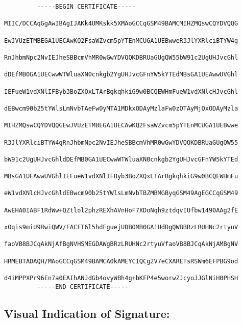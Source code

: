 \begin{verbatim}
         -----BEGIN CERTIFICATE-----
         MIIC/DCCAqGgAwIBAgIJAKk4UMKskk5XMAoGCCqGSM49BAMCMIHZMQswCQYDVQQG
         EwJVUzETMBEGA1UECAwKQ2FsaWZvcm5pYTEnMCUGA1UEBwweR3JlYXRlciBTYW4g
         RnJhbmNpc2NvIEJheSBBcmVhMR0wGwYDVQQKDBRUaGUgQW55bW91c2UgUHJvcGhl
         dDEfMB0GA1UECwwWTWluaXN0cnkgb2YgUHJvcGFnYW5kYTEdMBsGA1UEAwwUVGhl
         IEFueW1vdXNlIFByb3BoZXQxLTArBgkqhkiG9w0BCQEWHmFueW1vdXNlcHJvcGhl
         dEBwcm90b25tYWlsLmNvbTAeFw0yMTA1MDkxODAyMzlaFw0zOTAyMjQxODAyMzla
         MIHZMQswCQYDVQQGEwJVUzETMBEGA1UECAwKQ2FsaWZvcm5pYTEnMCUGA1UEBwwe
         R3JlYXRlciBTYW4gRnJhbmNpc2NvIEJheSBBcmVhMR0wGwYDVQQKDBRUaGUgQW55
         bW91c2UgUHJvcGhldDEfMB0GA1UECwwWTWluaXN0cnkgb2YgUHJvcGFnYW5kYTEd
         MBsGA1UEAwwUVGhlIEFueW1vdXNlIFByb3BoZXQxLTArBgkqhkiG9w0BCQEWHmFu
         eW1vdXNlcHJvcGhldEBwcm90b25tYWlsLmNvbTBZMBMGByqGSM49AgEGCCqGSM49
         AwEHA0IABF1RdWw+QZtlol2phzREXhAVnHoF7XDoNqh9ztdqvIUfbw1490AAg2fE
         xOqis9miU9RwiQWV/FACFT6l5hdFguejUDBOMB0GA1UdDgQWBBRzLRUHNc2rtyuV
         faoVB8BJCqAkNjAfBgNVHSMEGDAWgBRzLRUHNc2rtyuVfaoVB8BJCqAkNjAMBgNV
         HRMEBTADAQH/MAoGCCqGSM49BAMCA0kAMEYCIQCg2V7eCXARETsRSWm6EFPBG9od
         d4iMPPXPr96En7a0EAIhANJdGb4ovyWBh4g+bKFP4e5worwZJcyoJJGlNiH0PHSH
         -----END CERTIFICATE-----
\end{verbatim}

\clearpage

\subsection*{Visual Indication of Signature:}

\begin{Form}
\end{Form}

